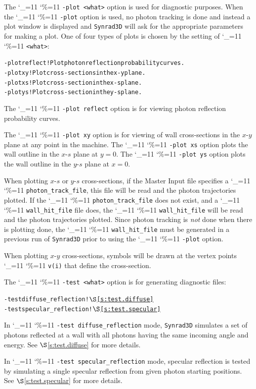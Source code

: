 \documentclass[11pt,openany]{report}
\newcommand{\sref}[1]{$\S$\ref{#1}}
\newcommand{\srthree}{\texttt{Synrad3D}\xspace}
\newcommand\ttcmd{\begingroup\catcode`\_=11 \catcode`\%=11 \dottcmd}
\newcommand\dottcmd[1]{\texttt{#1}\endgroup}
\newcommand{\vn}{\ttcmd}
\newlength{\ExBeg}
\newlength{\ExEnd}
\newenvironment{example}
  {\vspace{\ExBeg} \begin{alltt}}
  {\end{alltt} \vspace{\ExEnd}}
\begin{document}
The \vn{-plot <what>} option is used for diagnostic purposes. When the
\vn{-plot} option is used, no photon tracking is done and instead a
plot window is displayed and \srthree will ask for the appropriate
parameters for making a plot. One of four types of plots is chosen by
the setting of \vn{<what>}:
\begin{example}
  -plot reflect ! Plot photon reflection probability curves.
  -plot xy      ! Plot cross-sections in the x-y plane.
  -plot xs      ! Plot cross-section in the x-s plane.
  -plot ys      ! Plot cross-section in the y-s plane.
\end{example}

The \vn{-plot reflect} option is for viewing photon reflection
probability curves. 

The \vn{-plot xy} option is for viewing of wall
cross-sections in the $x$-$y$ plane at any point in the machine. The
\vn{-plot xs} option plots the wall outline in the $x$-$s$ plane at $y
= 0$. The \vn{-plot ys} option plots the wall outline in the $y$-$s$
plane at $x = 0$. 

When plotting $x$-$s$ or $y$-$s$ cross-sections, if the Master Input file specifies a
\vn{photon_track_file}, this file will be read and the photon trajectories plotted.  If
the \vn{photon_track_file} does not exist, and a \vn{wall_hit_file} file does, the
\vn{wall_hit_file} will be read and the photon trajectories plotted. Since photon tracking
is {\em not} done when there is plotting done, the \vn{wall_hit_file} must be generated in
a previous run of \srthree prior to using the \vn{-plot} option.

When plotting $x$-$y$ cross-sections, symbols
will be drawn at the vertex points \vn{v(i)} that define the
cross-section.

The \vn{-test <what>} option is for generating diagnostic
files:
\begin{example}
  -test diffuse_reflection     ! \sref{s:test.diffuse}
  -test specular_reflection    ! \sref{s:test.specular}
\end{example}

In \vn{-test diffuse_reflection} mode, \srthree simulates a set of photons
reflected at a wall with all photons having the same incoming angle
and energy. See \sref{s:test.diffuse} for more details.

In \vn{-test specular_reflection} mode, specular reflection is tested
by simulating a single specular reflection from given photon
starting positions. See \sref{s:test.specular} for more details.
\end{document}
